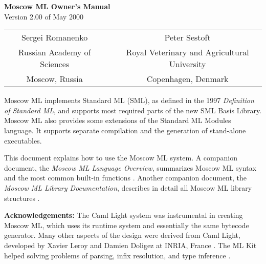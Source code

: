 \documentclass[fleqn]{article}
\begin{document}
\begin{center}

  {\huge\bf Moscow ML Owner's Manual}\\[0.5cm]

Version 2.00 of May 2000\\[0.7cm]

\begin{tabular}{ccc}
\large Sergei Romanenko && \large Peter Sestoft\\
Russian Academy of Sciences && Royal Veterinary and Agricultural University\\
Moscow, Russia && Copenhagen, Denmark
\end{tabular}

\end{center}

\vspace{0.5cm}

\noindent Moscow ML implements Standard ML (SML),
as defined in the 1997 {\em Definition of Standard ML\/}, and supports
most required parts of the new SML Basis Library.  Moscow ML also
provides some extensions of the Standard ML Modules language.  It
supports separate compilation and the generation of stand-alone
executables.

This document explains how to use the Moscow ML system.  A companion
document, the {\em Moscow ML Language Overview\/}, summarizes Moscow
ML syntax and the most common built-in functions
\cite{MoscowML:2000:MoscowMLLanguage}.  Another companion document,
the \emph{Moscow ML Library Documentation}, describes in detail all
Moscow ML library structures \cite{MoscowML:2000:MoscowMLLibrary}. 

{\bf Acknowledgements:} The Caml Light system was instrumental in
creating Moscow ML, which uses its runtime system and essentially the
same bytecode generator.  Many other aspects of the design were
derived from Caml Light, developed by Xavier Leroy and Damien Doligez
at INRIA, France \cite{Leroy:1990:TheZinc,Leroy:1993:TheCaml}.  The ML
Kit helped solving problems of parsing, infix resolution, and type
inference \cite{Birkedal:1993:TheML}.
\end{document}
